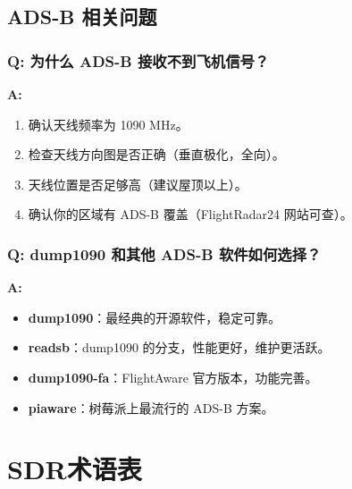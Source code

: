 \documentclass[12pt,UTF8]{ctexbook}
\begin{document}
\section{ADS-B 相关问题}
\label{sec:faq_adsb}

\subsection{Q: 为什么 ADS-B 接收不到飞机信号？}
\textbf{A:}
\begin{enumerate}[leftmargin=2cm]
    \item 确认天线频率为 1090 MHz。
    \item 检查天线方向图是否正确（垂直极化，全向）。
    \item 天线位置是否足够高（建议屋顶以上）。
    \item 确认你的区域有 ADS-B 覆盖（FlightRadar24 网站可查）。
\end{enumerate}

\subsection{Q: dump1090 和其他 ADS-B 软件如何选择？}
\textbf{A:}
\begin{itemize}[leftmargin=2cm]
    \item \textbf{dump1090}：最经典的开源软件，稳定可靠。
    \item \textbf{readsb}：dump1090 的分支，性能更好，维护更活跃。
    \item \textbf{dump1090-fa}：FlightAware 官方版本，功能完善。
    \item \textbf{piaware}：树莓派上最流行的 ADS-B 方案。
\end{itemize}

\chapter{SDR术语表}
\label{app:sdr_glossary}
\end{document}

